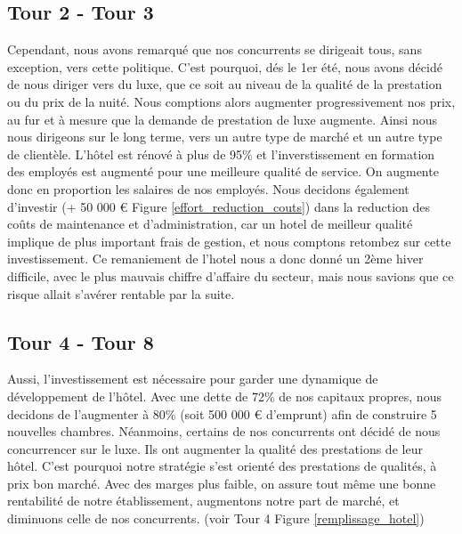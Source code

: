 \documentclass[a4paper,10pt]{article}
\begin{document}
    \subsection{Tour 2 - Tour 3}
      Cependant, nous avons remarqué que nos concurrents se dirigeait tous, sans exception, vers cette politique.
      C'est pourquoi, dés le 1er été, nous avons décidé de nous diriger vers du luxe,
      que ce soit au niveau de la qualité de la prestation ou du prix de la nuité.
      \newline
      \newline
      Nous comptions alors augmenter progressivement nos prix, au fur et à mesure que la demande de prestation de luxe augmente.
      Ainsi nous nous dirigeons sur le long terme, vers un autre type de marché et un autre type de clientèle.
      L’hôtel est rénové à plus de 95\% et l'inverstissement en formation des employés est augmenté pour une meilleure qualité de service.
      On augmente donc en proportion les salaires de nos employés.
      \newline
      \newline
      Nous decidons également d'investir (+ 50 000 \euro{} Figure \ref{effort_reduction_couts}) dans la reduction des coûts de maintenance et d'administration,
      car un hotel de meilleur qualité implique de plus important frais de gestion, et nous comptons retombez sur cette investissement.
      \newline
      \newline
      Ce remaniement de l'hotel nous a donc donné un 2ème hiver difficile, avec le plus mauvais chiffre d'affaire du secteur,
      mais nous savions que ce risque allait s'avérer rentable par la suite.

    \subsection{Tour 4 - Tour 8}
      Aussi,  l’investissement est nécessaire pour garder une dynamique de développement de l’hôtel. Avec une dette de 72\% de nos capitaux propres,
      nous decidons de l'augmenter à 80\% (soit 500 000 \euro{} d'emprunt) afin de construire 5 nouvelles chambres.
      \newline
      \newline
      Néanmoins, certains de nos concurrents ont décidé de nous concurrencer sur le luxe.
      Ils ont augmenter la qualité des prestations de leur hôtel.
      C’est pourquoi notre stratégie s’est orienté des prestations de qualités, à prix bon marché.
      Avec des marges plus faible, on assure tout même une bonne rentabilité de notre établissement,
      augmentons notre part de marché, et diminuons celle de nos concurrents. (voir Tour 4 Figure \ref{remplissage_hotel})
\end{document}
